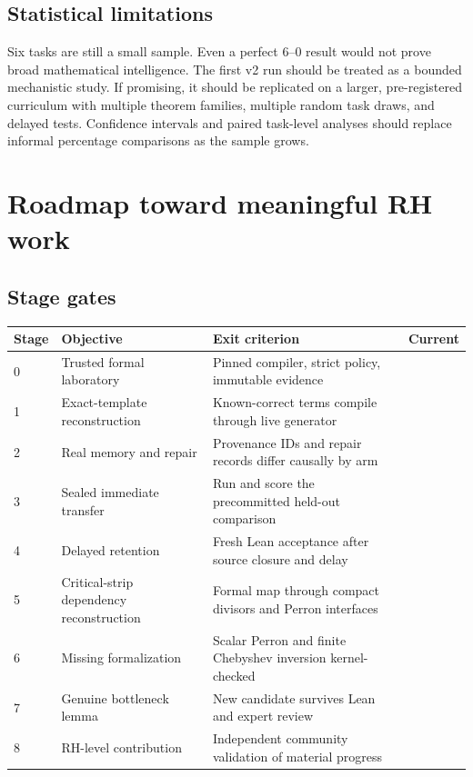 \documentclass[11pt,a4paper]{article}
\newcommand{\pass}{\textcolor{AionGreen}{\ding{51}}}
\newcommand{\pending}{\textcolor{AionAmber}{\raisebox{0.15ex}{\rule{0.8ex}{0.8ex}}}}
\begin{document}
\subsection{Statistical limitations}

Six tasks are still a small sample. Even a perfect 6--0 result would not prove
broad mathematical intelligence. The first v2 run should be treated as a
bounded mechanistic study. If promising, it should be replicated on a larger,
pre-registered curriculum with multiple theorem families, multiple random task
draws, and delayed tests. Confidence intervals and paired task-level analyses
should replace informal percentage comparisons as the sample grows.

\section{Roadmap toward meaningful RH work}

\subsection{Stage gates}

\begin{longtable}{p{12mm}p{42mm}p{72mm}p{28mm}}
\toprule
Stage & Objective & Exit criterion & Current \\
\midrule
\endhead
0 & Trusted formal laboratory & Pinned compiler, strict policy, immutable evidence & \pass \\
1 & Exact-template reconstruction & Known-correct terms compile through live generator & \pass \\
2 & Real memory and repair & Provenance IDs and repair records differ causally by arm & \pass \\
3 & Sealed immediate transfer & Run and score the precommitted held-out comparison & \pass \\
4 & Delayed retention & Fresh Lean acceptance after source closure and delay & \pass \\
5 & Critical-strip dependency reconstruction & Formal map through compact divisors and Perron interfaces & \pass \\
6 & Missing formalization & Scalar Perron and finite Chebyshev inversion kernel-checked & \pass \\
7 & Genuine bottleneck lemma & New candidate survives Lean and expert review & \pending \\
8 & RH-level contribution & Independent community validation of material progress & \pending \\
\bottomrule
\end{longtable}
\end{document}
